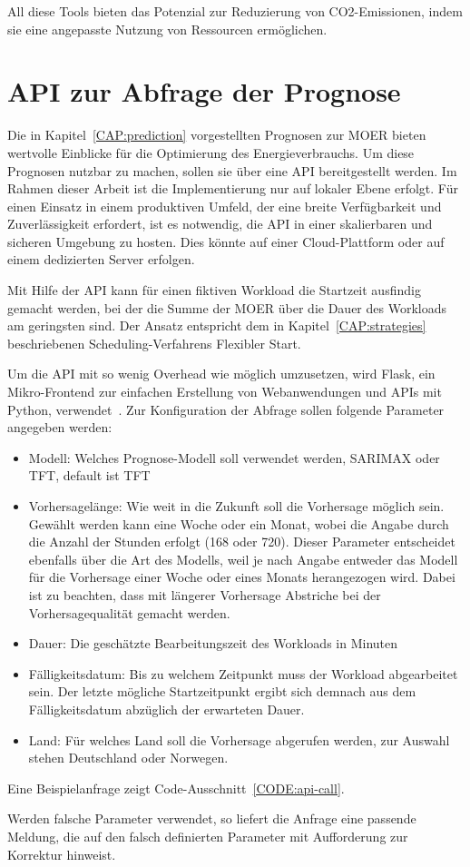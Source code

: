 All diese Tools bieten das Potenzial zur Reduzierung von CO2-Emissionen, indem sie eine angepasste Nutzung von Ressourcen ermöglichen.

\section{API zur Abfrage der Prognose}
Die in Kapitel~\ref{CAP:prediction} vorgestellten Prognosen zur \ac{MOER} bieten wertvolle Einblicke für die Optimierung des Energieverbrauchs.
Um diese Prognosen nutzbar zu machen, sollen sie über eine \ac{API} bereitgestellt werden.
Im Rahmen dieser Arbeit ist die Implementierung nur auf lokaler Ebene erfolgt.
Für einen Einsatz in einem produktiven Umfeld, der eine breite Verfügbarkeit und Zuverlässigkeit erfordert, ist es notwendig, die \ac{API} in einer skalierbaren und sicheren Umgebung zu hosten.
Dies könnte auf einer Cloud-Plattform oder auf einem dedizierten Server erfolgen.

Mit Hilfe der \ac{API} kann für einen fiktiven Workload die Startzeit ausfindig gemacht werden, bei der die Summe der \ac{MOER} über die Dauer des Workloads am geringsten sind.
Der Ansatz entspricht dem in Kapitel~\ref{CAP:strategies} beschriebenen Scheduling-Verfahrens \glqq Flexibler Start\grqq{}.

Um die \ac{API} mit so wenig Overhead wie möglich umzusetzen, wird Flask, ein Mikro-Frontend zur einfachen Erstellung von Webanwendungen und \acp{API} mit Python, verwendet~\cite{.20240203T21:13:11.000Z}.
Zur Konfiguration der Abfrage sollen folgende Parameter angegeben werden:
\begin{itemize}
 \item Modell: Welches Prognose-Modell soll verwendet werden, \ac{SARIMAX} oder \ac{TFT}, default ist \ac{TFT}
 \item Vorhersagelänge: Wie weit in die Zukunft soll die Vorhersage möglich sein.
 Gewählt werden kann eine Woche oder ein Monat, wobei die Angabe durch die Anzahl der Stunden erfolgt (168 oder 720).
 Dieser Parameter entscheidet ebenfalls über die Art des Modells, weil je nach Angabe entweder das Modell für die Vorhersage einer Woche oder eines Monats herangezogen wird.
 Dabei ist zu beachten, dass mit längerer Vorhersage Abstriche bei der Vorhersagequalität gemacht werden.
 \item Dauer: Die geschätzte Bearbeitungszeit des Workloads in Minuten
 \item Fälligkeitsdatum: Bis zu welchem Zeitpunkt muss der Workload abgearbeitet sein.
 Der letzte mögliche Startzeitpunkt ergibt sich demnach aus dem Fälligkeitsdatum abzüglich der erwarteten Dauer.
 \item Land: Für welches Land soll die Vorhersage abgerufen werden, zur Auswahl stehen Deutschland oder Norwegen.
\end{itemize}
Eine Beispielanfrage zeigt Code-Ausschnitt~\ref{CODE:api-call}.

Werden falsche Parameter verwendet, so liefert die Anfrage eine passende Meldung, die auf den falsch definierten Parameter mit Aufforderung zur Korrektur hinweist.

